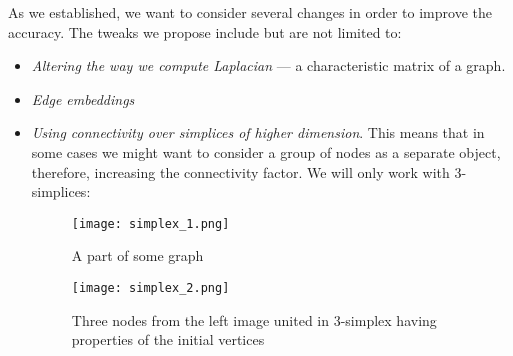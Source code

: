     As we established, we want to consider several changes in order to improve the accuracy.
    The tweaks we propose include but are not limited to:
    \begin{itemize}
        \item \textit{Altering the way we compute Laplacian} --- a characteristic matrix of a graph.
        \item \textit{Edge embeddings}
        \item \textit{Using connectivity over simplices of higher dimension}. This means that in some cases we might want to consider a group of nodes as a separate object, therefore, increasing the connectivity factor. We will only work with 3-simplices:
            \begin{figure}[h]
                \begin{multicols}{2}
                    \centering
                    \texttt{[image: simplex\_1.png]}
                    \caption{A part of some graph}
        
                    \centering
                    \texttt{[image: simplex\_2.png]}
                    \caption{Three nodes from the left image united in 3-simplex having properties of the initial vertices}
                \end{multicols}
            \end{figure}
    \end{itemize}

